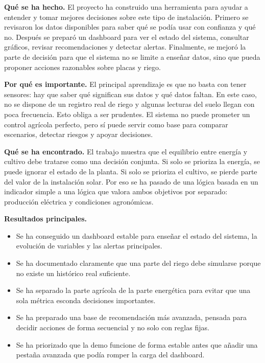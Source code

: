 \documentclass[11pt,a4paper]{article}
\begin{document}
\textbf{Qu\'e se ha hecho.} El proyecto ha construido una herramienta para ayudar a entender y tomar mejores decisiones sobre este tipo de instalaci\'on. Primero se revisaron los datos disponibles para saber qu\'e se pod\'ia usar con confianza y qu\'e no. Despu\'es se prepar\'o un dashboard para ver el estado del sistema, consultar gr\'aficos, revisar recomendaciones y detectar alertas. Finalmente, se mejor\'o la parte de decisi\'on para que el sistema no se limite a ense\~nar datos, sino que pueda proponer acciones razonables sobre placas y riego.

\textbf{Por qu\'e es importante.} El principal aprendizaje es que no basta con tener sensores: hay que saber qu\'e significan sus datos y qu\'e datos faltan. En este caso, no se dispone de un registro real de riego y algunas lecturas del suelo llegan con poca frecuencia. Esto obliga a ser prudentes. El sistema no puede prometer un control agr\'icola perfecto, pero s\'i puede servir como base para comparar escenarios, detectar riesgos y apoyar decisiones.

\textbf{Qu\'e se ha encontrado.} El trabajo muestra que el equilibrio entre energ\'ia y cultivo debe tratarse como una decisi\'on conjunta. Si solo se prioriza la energ\'ia, se puede ignorar el estado de la planta. Si solo se prioriza el cultivo, se pierde parte del valor de la instalaci\'on solar. Por eso se ha pasado de una l\'ogica basada en un indicador simple a una l\'ogica que valora ambos objetivos por separado: producci\'on el\'ectrica y condiciones agron\'omicas.

\textbf{Resultados principales.}
\begin{itemize}
    \item Se ha conseguido un dashboard estable para ense\~nar el estado del sistema, la evoluci\'on de variables y las alertas principales.
    \item Se ha documentado claramente que una parte del riego debe simularse porque no existe un hist\'orico real suficiente.
    \item Se ha separado la parte agr\'icola de la parte energ\'etica para evitar que una sola m\'etrica esconda decisiones importantes.
    \item Se ha preparado una base de recomendaci\'on m\'as avanzada, pensada para decidir acciones de forma secuencial y no solo con reglas fijas.
    \item Se ha priorizado que la demo funcione de forma estable antes que a\~nadir una pesta\~na avanzada que pod\'ia romper la carga del dashboard.
\end{itemize}
\end{document}
